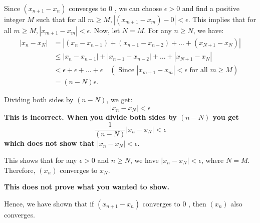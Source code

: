 \documentclass{report}
\begin{document}
Since $\left(x_{n+1}-x_n\right)$ converges to 0 , we can choose $\epsilon>0$ and find a positive integer $M$ such that for all $m \geq M,\left|\left(x_{m+1}-x_m\right)-0\right|<\epsilon$. This implies that for all $m \geq M,\left|x_{m+1}-x_m\right|<\epsilon$.
Now, let $N=M$. For any $n \geq N$, we have:
$$
\begin{aligned}
\left|x_n-x_N\right| & =\left|\left(x_n-x_{n-1}\right)+\left(x_{n-1}-x_{n-2}\right)+\ldots+\left(x_{N+1}-x_N\right)\right| \\
& \leq\left|x_n-x_{n-1}\right|+\left|x_{n-1}-x_{n-2}\right|+\ldots+\left|x_{N+1}-x_N\right| \\
& <\epsilon+\epsilon+\ldots+\epsilon \quad\left(\text { Since }\left|x_{m+1}-x_m\right|<\epsilon \text { for all } m \geq M\right) \\
& =(n-N) \epsilon .
\end{aligned}
$$

Dividing both sides by $(n-N)$, we get:
$$
\left|x_n-x_N\right|<\epsilon
$$
\textbf{This is incorrect. When you divide both sides by $(n-N)$
you get
$$
\frac{1}{(n-N)}\left|x_n-x_N\right|<\epsilon
$$
which does not show that $\left|x_n-x_N\right|<\epsilon. $
}

This shows that for any $\epsilon>0$ and $n \geq N$, we have $\left|x_n-x_N\right|<\epsilon$, where $N=M$. Therefore, $\left(x_n\right)$ converges to $x_N$.

\textbf{This does not prove what you wanted to show. }

Hence, we have shown that if $\left(x_{n+1}-x_n\right)$ converges to 0 , then $\left(x_n\right)$ also converges.
\end{document}
